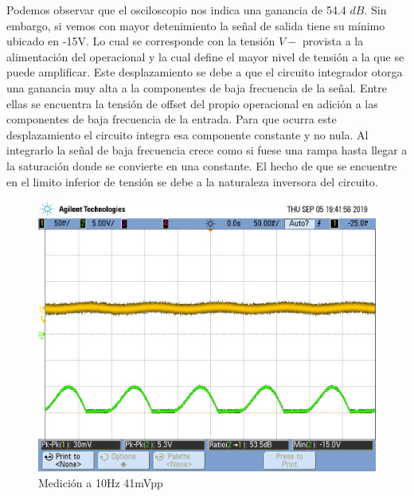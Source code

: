 \documentclass[a4paper]{article}
\begin{document}
Podemos observar que el osciloscopio nos indica una ganancia de 54.4 $dB$. Sin embargo, si vemos con mayor detenimiento la señal de salida tiene su mínimo ubicado en -15V. Lo cual se corresponde con la tensión $V-$ provista a la alimentación del operacional y la cual define el mayor nivel de tensión a la que se puede amplificar.
Este desplazamiento se debe a que el circuito integrador otorga una ganancia muy alta a la componentes de baja frecuencia de la señal. Entre ellas se encuentra la tensión de offset del  propio operacional en adición a las componentes de baja frecuencia de la entrada. Para que ocurra este desplazamiento el circuito integra esa componente constante y no nula. Al integrarlo la señal de baja frecuencia crece como si fuese una rampa hasta llegar a la saturación donde se convierte en una constante. El hecho de que se encuentre en el limito inferior de tensión se debe a la naturaleza inversora del circuito. 
\begin{figure}[H]
	\centering
	\includegraphics[width=\textwidth]{Ejercicio4/FOTOS-TP2-TC-EJ4/piso}
	\caption{Medición a 10Hz 41mVpp}
\end{figure}
\end{document}
